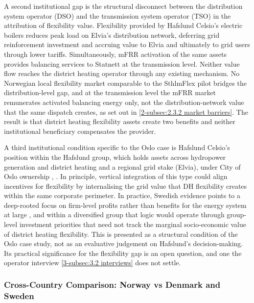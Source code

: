 A second institutional gap is the structural disconnect between the distribution system operator (DSO) and the transmission system operator (TSO) in the attribution of flexibility value. Flexibility provided by Hafslund Celsio's electric boilers reduces peak load on Elvia's distribution network, deferring grid reinforcement investment and accruing value to Elvia and ultimately to grid users through lower tariffs. Simultaneously, mFRR activation of the same assets provides balancing services to Statnett at the transmission level. Neither value flow reaches the district heating operator through any existing mechanism. No Norwegian local flexibility market comparable to the SthlmFlex pilot bridges the distribution-level gap, and at the transmission level the mFRR market remunerates activated balancing energy only, not the distribution-network value that the same dispatch creates, as set out in \autoref{2-subsec:2.3.2 market barriers}. The result is that district heating flexibility assets create two benefits and neither institutional beneficiary compensates the provider.

A third institutional condition specific to the Oslo case is Hafslund Celsio's position within the Hafslund group, which holds assets across hydropower generation and district heating and a regional grid stake (Elvia), under City of Oslo ownership \cite{hafslund_interim_nodate}, \cite{hafslund_arsrapport_nodate}. In principle, vertical integration of this type could align incentives for flexibility by internalising the grid value that DH flexibility creates within the same corporate perimeter. In practice, Swedish evidence points to a deep-rooted focus on firm-level profits rather than benefits for the energy system at large \cite{fernqvist_district_2023}, and within a diversified group that logic would operate through group-level investment priorities that need not track the marginal socio-economic value of district heating flexibility. This is presented as a structural condition of the Oslo case study, not as an evaluative judgement on Hafslund's decision-making. Its practical significance for the flexibility gap is an open question, and one the operator interview \autoref{3-subsec:3.2 interviews} does not settle.


\subsubsection{Cross-Country Comparison: Norway vs Denmark and Sweden}
\label{2-subsec:2.3.5 cross-country comparison}


